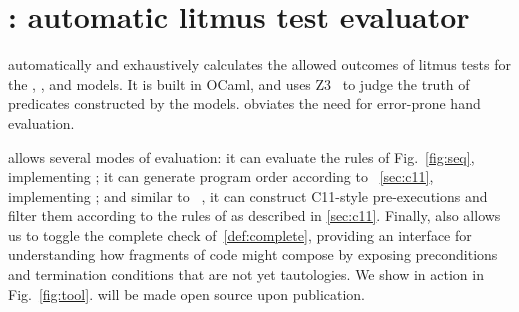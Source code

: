 \section{\PwTerTITLE: automatic litmus test evaluator}
\label{sec:tool}

\PwTer{} automatically and exhaustively calculates the allowed outcomes of litmus tests for the \PwT, \PwTpo, and \PwTc{} models. It is built in OCaml, and uses Z3~\cite{Z3Solver} to judge the truth of predicates constructed by the models. \PwTer{} obviates the need for error-prone hand evaluation.

\PwTer{} allows several modes of evaluation: it can evaluate the rules of Fig.~\ref{fig:seq}, implementing \PwT; it can generate program order according to \textsection~\ref{sec:c11}, implementing \PwTpo; and similar to \MRD~\cite{DBLP:conf/esop/PaviottiCPWOB20}, it can construct C11-style pre-executions and filter them according to the rules of \rcXI{} as described in \textsection\ref{sec:c11}.
Finally, \PwTer{} also allows us to toggle the complete check of~\ref{def:complete}, providing an interface for understanding how fragments of code might compose by exposing preconditions and termination conditions that are not yet tautologies.
We show \PwTer{} in action in Fig.~\ref{fig:tool}. 
\PwTer{} will be made open source upon publication.







